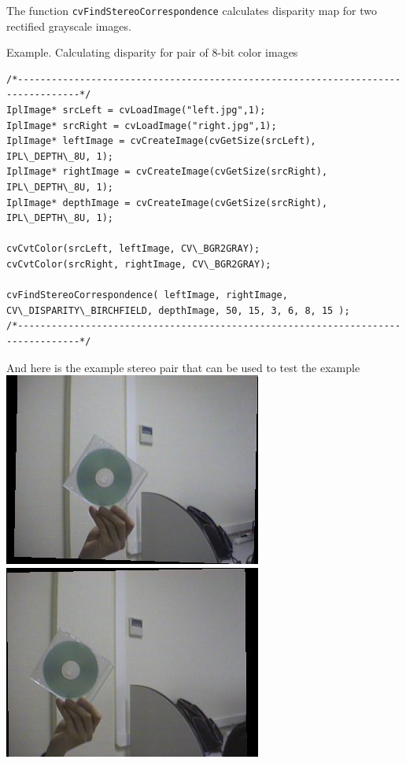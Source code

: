 The function \texttt{cvFindStereoCorrespondence} calculates disparity map for two rectified grayscale images.

Example. Calculating disparity for pair of 8-bit color images

\begin{lstlisting}
/*---------------------------------------------------------------------------------*/
IplImage* srcLeft = cvLoadImage("left.jpg",1);
IplImage* srcRight = cvLoadImage("right.jpg",1);
IplImage* leftImage = cvCreateImage(cvGetSize(srcLeft), IPL\_DEPTH\_8U, 1);
IplImage* rightImage = cvCreateImage(cvGetSize(srcRight), IPL\_DEPTH\_8U, 1);
IplImage* depthImage = cvCreateImage(cvGetSize(srcRight), IPL\_DEPTH\_8U, 1);

cvCvtColor(srcLeft, leftImage, CV\_BGR2GRAY);
cvCvtColor(srcRight, rightImage, CV\_BGR2GRAY);

cvFindStereoCorrespondence( leftImage, rightImage, CV\_DISPARITY\_BIRCHFIELD, depthImage, 50, 15, 3, 6, 8, 15 );
/*---------------------------------------------------------------------------------*/

\end{lstlisting}

And here is the example stereo pair that can be used to test the example
\newline
\includegraphics{pics/left.jpg}
\newline
\includegraphics{pics/right.jpg}


